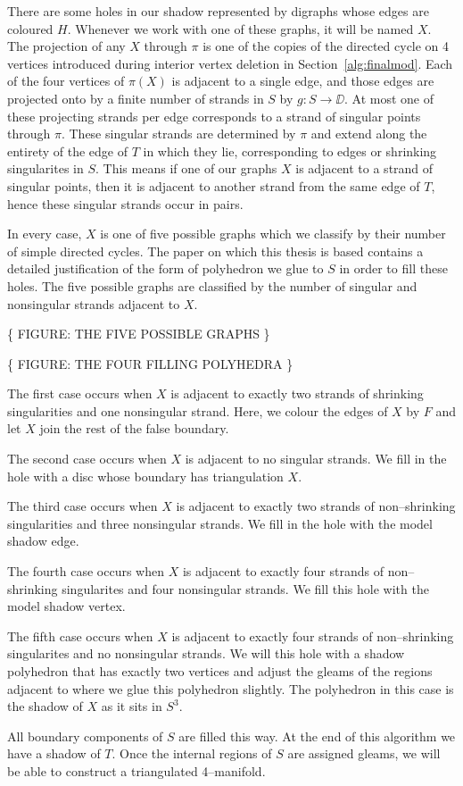 \label{alg:fillholes}
There are some holes in our shadow represented by digraphs whose edges are coloured $H$.
Whenever we work with one of these graphs, it will be named $X$.
The projection of any $X$ through $\pi$ is one of the copies of the directed cycle on 4 vertices introduced during interior vertex deletion in Section~\ref{alg:finalmod}.
Each of the four vertices of $\pi(X)$ is adjacent to a single edge, and those edges are projected onto by a finite number of strands in $S$ by $g:S\to\DD$.
At most one of these projecting strands per edge corresponds to a strand of singular points through $\pi$.
These singular strands are determined by $\pi$ and extend along the entirety of the edge of $T$ in which they lie, corresponding to edges or shrinking singularites in $S$.
This means if one of our graphs $X$ is adjacent to a strand of singular points, then it is adjacent to another strand from the same edge of $T$, hence these singular strands occur in pairs.

In every case, $X$ is one of five possible graphs which we classify by their number of simple directed cycles.
The paper on which this thesis is based contains a detailed justification of the form of polyhedron we glue to $S$ in order to fill these holes.
The five possible graphs are classified by the number of singular and nonsingular strands adjacent to $X$.

\{ FIGURE: THE FIVE POSSIBLE GRAPHS \}

\{ FIGURE: THE FOUR FILLING POLYHEDRA \}

The first case occurs when $X$ is adjacent to exactly two strands of shrinking singularities and one nonsingular strand.
Here, we colour the edges of $X$ by $F$ and let $X$ join the rest of the false boundary.

The second case occurs when $X$ is adjacent to no singular strands.
We fill in the hole with a disc whose boundary has triangulation $X$.

The third case occurs when $X$ is adjacent to exactly two strands of non--shrinking singularities and three nonsingular strands.
We fill in the hole with the model shadow edge.

The fourth case occurs when $X$ is adjacent to exactly four strands of non--shrinking singularites and four nonsingular strands.
We fill this hole with the model shadow vertex.

The fifth case occurs when $X$ is adjacent to exactly four strands of non--shrinking singularites and no nonsingular strands.
We will this hole with a shadow polyhedron that has exactly two vertices and adjust the gleams of the regions adjacent to where we glue this polyhedron slightly.
The polyhedron in this case is the shadow of $X$ as it sits in $S^3$.

All boundary components of $S$ are filled this way.
At the end of this algorithm we have a shadow of $T$.
Once the internal regions of $S$ are assigned gleams, we will be able to construct a triangulated 4--manifold.




